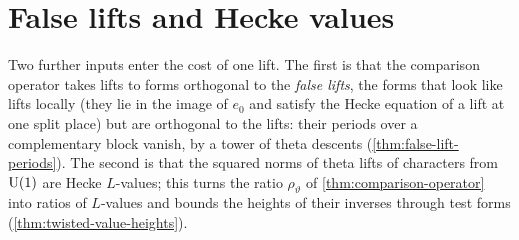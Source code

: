 \section{False lifts and Hecke values}\label{sec:false-lifts}

Two further inputs enter the cost of one lift. The first is that the comparison operator takes lifts to forms orthogonal to the \emph{false lifts}, the forms that look
like lifts locally (they lie in the image of $e_0$ and satisfy the Hecke equation of a lift at one split place) but are orthogonal to the lifts: their periods over a
complementary block vanish, by a tower of theta descents (\cref{thm:false-lift-periods}). The second is that the squared norms of theta lifts of characters from
$\operatorname{U}(1)$ are Hecke $L$-values; this turns the ratio $\rho_\vartheta$ of \cref{thm:comparison-operator} into ratios of $L$-values and bounds the heights of their inverses through
test forms (\cref{thm:twisted-value-heights}).

